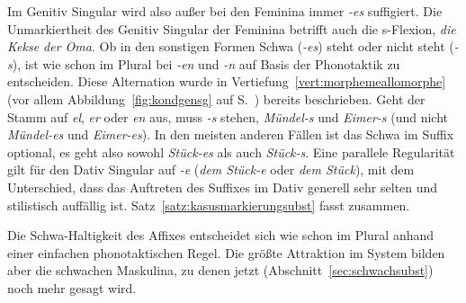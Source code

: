 Im Genitiv Singular wird also außer bei den Feminina immer \textit{-es} suffigiert.
Die Unmarkiertheit des Genitiv Singular der Feminina betrifft auch die s-Flexion, \zB \textit{die Kekse der Oma}.
Ob in den sonstigen Formen Schwa (\textit{-es}) steht oder nicht steht (\textit{-s}), ist wie schon im Plural bei \textit{-en} und \textit{-n} auf Basis der Phonotaktik zu entscheiden.
Diese Alternation wurde in Vertiefung~\ref{vert:morphemeallomorphe} (vor allem Abbildung~\ref{fig:kondgensg} auf S.~\pageref{fig:kondgensg}) bereits beschrieben.
Geht der Stamm auf \textit{el}, \textit{er} oder \textit{en} aus, muss \textit{-s} stehen, \zB \textit{Mündel-s} und \textit{Eimer-s} (und nicht \textit{\Ast Mündel-es} und \textit{\Ast Eimer-es}).
In den meisten anderen Fällen ist das Schwa im Suffix optional, es geht also sowohl \textit{Stück-es} als auch \textit{Stück-s}.
Eine parallele Regularität gilt für den Dativ Singular auf \textit{-e} (\textit{dem Stück-e} oder \textit{dem Stück}), mit dem Unterschied, dass das Auftreten des Suffixes im Dativ generell sehr selten und stilistisch auffällig ist.
Satz~\ref{satz:kasusmarkierungsubst} fasst zusammen.




Die Schwa-Haltigkeit des Affixes entscheidet sich wie schon im Plural anhand einer einfachen phonotaktischen Regel.
Die größte Attraktion im System bilden aber die schwachen Maskulina, zu denen jetzt (Abschnitt~\ref{sec:schwachsubst}) noch mehr gesagt wird.


